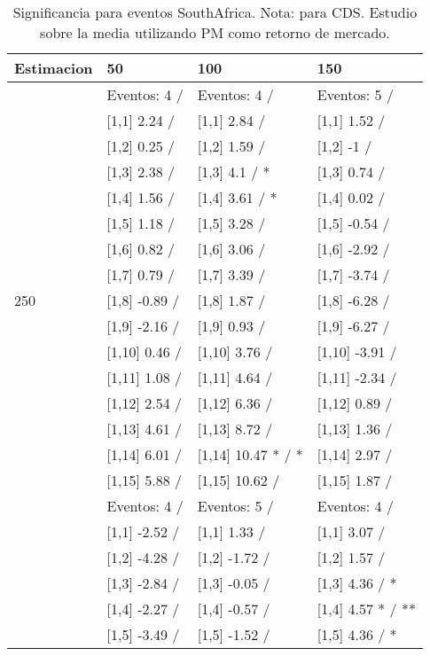 \begin{table}

\caption{Significancia para eventos SouthAfrica. Nota: para CDS. Estudio sobre la media utilizando PM como retorno de mercado.}
\centering
\begin{tabular}[t]{llll}
\toprule
Estimacion & 50 & 100 & 150\\
\midrule
 & Eventos:  4 / & Eventos:  4 / & Eventos:  5 /\\
 & {}[1,1] 2.24  / & {}[1,1] 2.84  / & {}[1,1] 1.52  /\\
 & {}[1,2] 0.25  / & {}[1,2] 1.59  / & {}[1,2] -1  /\\
 & {}[1,3] 2.38  / & {}[1,3] 4.1  / * & {}[1,3] 0.74  /\\
 & {}[1,4] 1.56  / & {}[1,4] 3.61  / * & {}[1,4] 0.02  /\\
\addlinespace
 & {}[1,5] 1.18  / & {}[1,5] 3.28  / & {}[1,5] -0.54  /\\
 & {}[1,6] 0.82  / & {}[1,6] 3.06  / & {}[1,6] -2.92  /\\
 & {}[1,7] 0.79  / & {}[1,7] 3.39  / & {}[1,7] -3.74  /\\
250 & {}[1,8] -0.89  / & {}[1,8] 1.87  / & {}[1,8] -6.28  /\\
 & {}[1,9] -2.16  / & {}[1,9] 0.93  / & {}[1,9] -6.27  /\\
\addlinespace
 & {}[1,10] 0.46  / & {}[1,10] 3.76  / & {}[1,10] -3.91  /\\
 & {}[1,11] 1.08  / & {}[1,11] 4.64  / & {}[1,11] -2.34  /\\
 & {}[1,12] 2.54  / & {}[1,12] 6.36  / & {}[1,12] 0.89  /\\
 & {}[1,13] 4.61  / & {}[1,13] 8.72  / & {}[1,13] 1.36  /\\
 & {}[1,14] 6.01  / & {}[1,14] 10.47 * / * & {}[1,14] 2.97  /\\
\addlinespace
 & {}[1,15] 5.88  / & {}[1,15] 10.62  / & {}[1,15] 1.87  /\\
 & Eventos:  4 / & Eventos:  5 / & Eventos:  4 /\\
 & {}[1,1] -2.52  / & {}[1,1] 1.33  / & {}[1,1] 3.07  /\\
 & {}[1,2] -4.28  / & {}[1,2] -1.72  / & {}[1,2] 1.57  /\\
 & {}[1,3] -2.84  / & {}[1,3] -0.05  / & {}[1,3] 4.36  / *\\
\addlinespace
 & {}[1,4] -2.27  / & {}[1,4] -0.57  / & {}[1,4] 4.57 * / **\\
 & {}[1,5] -3.49  / & {}[1,5] -1.52  / & {}[1,5] 4.36  / *\\

\end{tabular}
\end{table}
